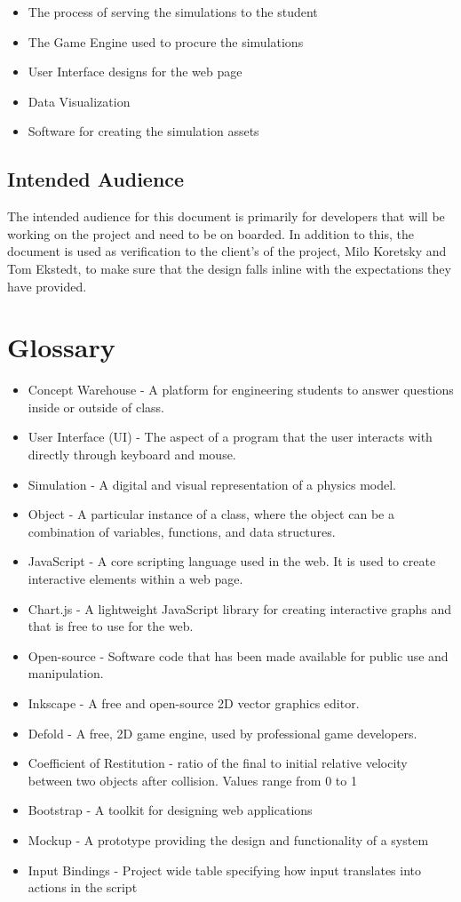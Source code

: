 \documentclass[onecolumn, draftclsnofoot,10pt, compsoc]{IEEEtran}
\begin{document}
\begin{itemize}
  \item The process of serving the simulations to the student
  \item The Game Engine used to procure the simulations
  \item User Interface designs for the web page
  \item Data Visualization
  \item Software for creating the simulation assets
\end{itemize} 

\subsection{Intended Audience}
The intended audience for this document is primarily for developers that will be working on the project and need to be on boarded. In addition to this, the document is used as verification to the client's of the project, Milo Koretsky and Tom Ekstedt, to make sure that the design falls inline with the expectations they have provided.


\section{Glossary}
\begin{itemize}
  \item Concept Warehouse - A platform for engineering students to answer questions inside or outside of class.
  \item User Interface (UI) - The aspect of a program that the user interacts with directly through keyboard and mouse.
  \item Simulation - A digital and visual representation of a physics model.
  \item Object - A particular instance of a class, where the object can be a combination of variables, functions, and data structures.
  \item JavaScript - A core scripting language used in the web. It is used to create interactive elements within a web page.
  \item Chart.js - A lightweight JavaScript library for creating interactive graphs and that is free to use for the web.
  \item Open-source - Software code that has been made available for public use and manipulation.
  \item Inkscape - A free and open-source 2D vector graphics editor.
  \item Defold - A free, 2D game engine, used by professional game developers.
  \item Coefficient of Restitution - ratio of the final to initial relative velocity between two objects after collision. Values range from 0 to 1
  \item Bootstrap - A toolkit for designing web applications
  \item Mockup - A prototype providing the design and functionality of a system 
  \item Input Bindings - Project wide table specifying how input translates into actions in the script
\end{itemize} 
\end{document}
